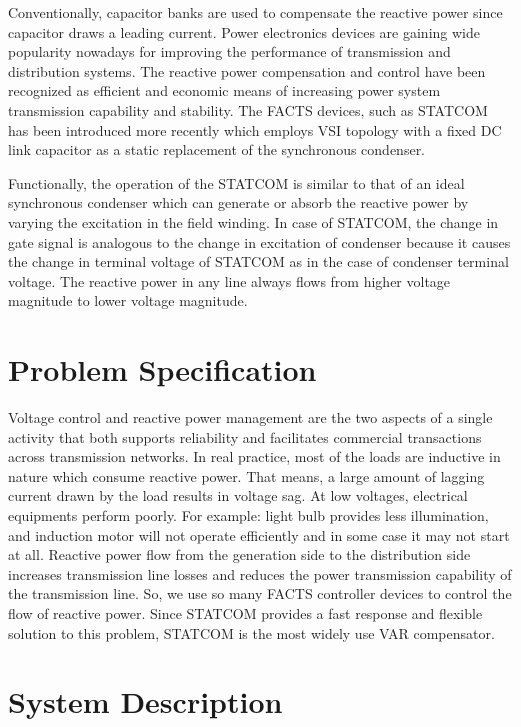 \documentclass[journal,twoside]{IEEEtran}
\begin{document}
\bigskip

Conventionally, capacitor banks are used to
compensate the reactive power since capacitor
draws a leading current. Power electronics
devices are gaining wide popularity nowadays for improving the
performance of transmission and distribution
systems. The reactive power compensation and
control have been recognized as efficient and
economic means of increasing power system
transmission capability and stability. The FACTS
devices, such as STATCOM has been introduced
more recently which employs VSI topology with a fixed
DC link capacitor as a static replacement of the
synchronous condenser.

\bigskip
Functionally, the operation of the STATCOM is
similar to that of an ideal synchronous
condenser which can generate or absorb the
reactive power by varying the excitation in the
field winding. In case of STATCOM, the change in
gate signal is analogous to the change in
excitation of condenser because it causes the
change in terminal voltage of STATCOM as in the
case of condenser terminal voltage. The reactive
power in any line always flows from higher
voltage magnitude to lower voltage magnitude.
	

\section{Problem Specification}

Voltage
control
and
reactive
power
management are the two aspects of a single
activity that both supports reliability and
facilitates commercial transactions across
transmission networks. In real practice, most of
the loads are inductive in nature which consume
reactive power. That means, a large amount of
lagging current drawn by the load results in
voltage sag. At low voltages, electrical
equipments perform poorly. For example: light bulb provides less illumination, and induction
motor will not operate efficiently and in some
case it may not start at all. Reactive power flow
from the generation side to the distribution side
increases transmission line losses and reduces
the power transmission capability of the transmission line. So, we use so many FACTS
controller devices to control the flow of reactive
power. Since STATCOM provides a fast response
and flexible solution to this problem, STATCOM
is the most widely use VAR compensator. 



	\section{System Description}
\end{document}

